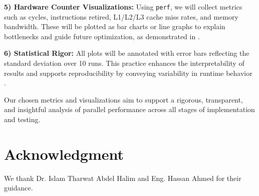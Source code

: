 \documentclass[conference, 10pt]{IEEEtran}
\begin{document}
\vspace{0.5em}
\textbf{5) Hardware Counter Visualizations:} 
Using \texttt{perf}, we will collect metrics such as cycles, instructions retired, L1/L2/L3 cache miss rates, and memory bandwidth. These will be plotted as bar charts or line graphs to explain bottlenecks and guide future optimization, as demonstrated in \cite{Yoon2012}.

\vspace{0.5em}
\textbf{6) Statistical Rigor:} 
All plots will be annotated with error bars reflecting the standard deviation over 10 runs. This practice enhances the interpretability of results and supports reproducibility by conveying variability in runtime behavior \cite{Yoon2012}.

Our chosen metrics and visualizations aim to support a rigorous, transparent, and insightful analysis of parallel performance across all stages of implementation and testing.







\section*{Acknowledgment} 
We thank Dr. Islam Tharwat Abdel Halim and Eng. Hassan Ahmed for their guidance.


 
\end{document}
